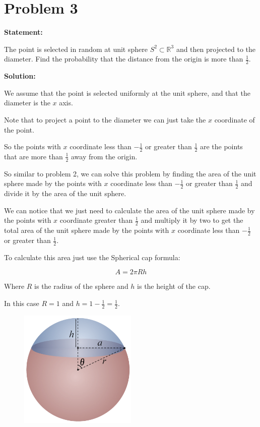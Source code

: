 \section*{Problem 3}

\textbf{Statement:}

The point is selected in random at unit sphere $S^2 \subset \mathbb{R}^3$ and
then projected to the diameter. Find the probability that the distance from
the origin is more than $\frac{1}{2}$.

\noindent\textbf{Solution:}

We assume that the point is selected uniformly at the unit sphere, and that the
diameter is the $x$ axis.

Note that to project a point to the diameter we can just take the $x$ coordinate
of the point.

So the points with $x$ coordinate less than $-\frac{1}{2}$ or greater than
$\frac{1}{2}$ are the points that are more than $\frac{1}{2}$ away from the origin.

So similar to problem 2, we can solve this problem by finding the area of
the unit sphere made by the points with $x$ coordinate less than $-\frac{1}{2}$
or greater than $\frac{1}{2}$ and divide it by the area of the unit sphere.

We can notice that we just need to calculate the area of the unit sphere made
by the points with $x$ coordinate greater than $\frac{1}{2}$ and multiply it by
two to get the total area of the unit sphere made by the points with $x$ coordinate
less than $-\frac{1}{2}$ or greater than $\frac{1}{2}$.

To calculate this area just use the Spherical cap formula:

\begin{equation*}
    A = 2\pi R h
\end{equation*}

Where $R$ is the radius of the sphere and $h$ is the height of the cap.

In this case $R = 1$ and $h = 1 - \frac{1}{2} = \frac{1}{2}$.

\begin{figure}[H]
    \centering
    \includegraphics[width=0.5\textwidth]{images/spherical-cap.png}
\end{figure}

